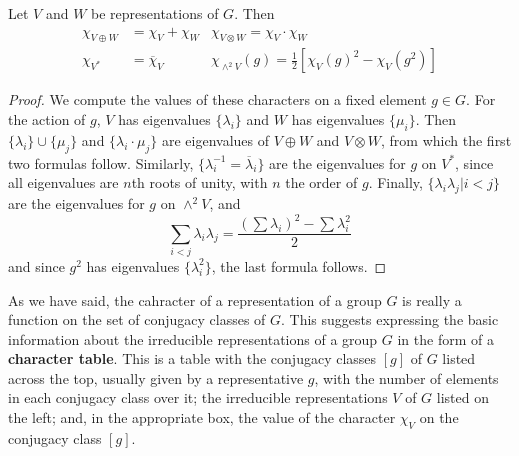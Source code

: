 \begin{proposition}
    Let $V$ and $W$ be representations of $G$. Then \begin{align*}
        \chi_{V\oplus W} &= \chi_V+\chi_W &\chi_{V\otimes W} = \chi_V\cdot \chi_W \\
        \chi_{V^*} &= \overline{\chi}_V &\chi_{\wedge^2V}(g) = \frac{1}{2}[\chi_V(g)^2 - \chi_V(g^2)]
    \end{align*}
\end{proposition}
\begin{proof}
    We compute the values of these characters on a fixed element $g \in G$. For the action of $g$, $V$ has eigenvalues $\{\lambda_i\}$ and $W$ has eigenvalues $\{\mu_i\}$. Then $\{\lambda_i\}\cup\{\mu_j\}$ and $\{\lambda_i\cdot\mu_j\}$ are eigenvalues of $V\oplus W$ and $V\otimes W$, from which the first two formulas follow. Similarly, $\{\lambda_i^{-1} = \overline{\lambda}_i\}$ are the eigenvalues for $g$ on $V^*$, since all eigenvalues are $n$th roots of unity, with $n$ the order of $g$. Finally, $\{\lambda_i\lambda_j|i < j\}$ are the eigenvalues for $g$ on $\wedge^2V$, and \begin{equation*}
        \sum_{i<j}\lambda_i\lambda_j = \frac{\left(\sum\lambda_i\right)^2 - \sum\lambda_i^2}{2}
    \end{equation*}
    and since $g^2$ has eigenvalues $\{\lambda_i^2\}$, the last formula follows.
\end{proof}

As we have said, the cahracter of a representation of a group $G$ is really a function on the set of conjugacy classes of $G$. This suggests expressing the basic information about the irreducible representations of a group $G$ in the form of a \textbf{character table}. This is a table with the conjugacy classes $[g]$ of $G$ listed across the top, usually given by a representative $g$, with the number of elements in each conjugacy class over it; the irreducible representations $V$ of $G$ listed on the left; and, in the appropriate box, the value of the character $\chi_V$ on the conjugacy class $[g]$.

